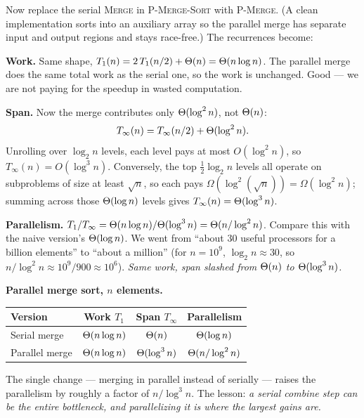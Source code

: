 Now replace the serial \textsc{Merge} in \textsc{P-Merge-Sort} with
\textsc{P-Merge}. (A clean implementation sorts into an auxiliary array so the
parallel merge has separate input and output regions and stays race-free.) The
recurrences become:

\textbf{Work.} Same shape, $T_1(n) = 2\,T_1(n/2) + \Theta(n) = \Theta(n\log n)$. The
parallel merge does the same total work as the serial one, so the work is
unchanged. Good --- we are not paying for the speedup in wasted computation.

\textbf{Span.} Now the merge contributes only $\Theta(\log^2 n)$, not $\Theta(n)$:
\[
T_\infty(n) = T_\infty(n/2) + \Theta(\log^2 n).
\]
Unrolling over $\log_2 n$ levels, each level pays at most $O(\log^2 n)$, so
$T_\infty(n) = O(\log^3 n)$. Conversely, the top $\tfrac{1}{2}\log_2 n$ levels
all operate on subproblems of size at least $\sqrt{n}$, so each pays
$\Omega(\log^2(\sqrt{n})) = \Omega(\log^2 n)$; summing across those
$\Theta(\log n)$ levels gives $T_\infty(n) = \Theta(\log^3 n)$.

\textbf{Parallelism.} $T_1/T_\infty = \Theta(n\log n)/\Theta(\log^3 n) =
\Theta(n/\log^2 n)$. Compare this with the naive version's $\Theta(\log n)$. We went from
``about $30$ useful processors for a billion elements'' to ``about a million''
(for $n=10^9$, $\log_2 n \approx 30$, so $n/\log^2 n \approx 10^9/900 \approx
10^6$). \emph{Same work, span slashed from $\Theta(n)$ to $\Theta(\log^3 n)$.}

\begin{complexitybox}
\textbf{Parallel merge sort, $n$ elements.}
\begin{center}
\begin{tabular}{lccc}
\toprule
Version & Work $T_1$ & Span $T_\infty$ & Parallelism \\
\midrule
Serial merge & $\Theta(n\log n)$ & $\Theta(n)$ & $\Theta(\log n)$ \\
Parallel merge & $\Theta(n\log n)$ & $\Theta(\log^3 n)$ & $\Theta(n/\log^2 n)$ \\
\bottomrule
\end{tabular}
\end{center}
The single change --- merging in parallel instead of serially --- raises the
parallelism by roughly a factor of $n/\log^3 n$. The lesson: \emph{a serial combine step can be the entire bottleneck, and
parallelizing it is where the largest gains are.}
\end{complexitybox}

